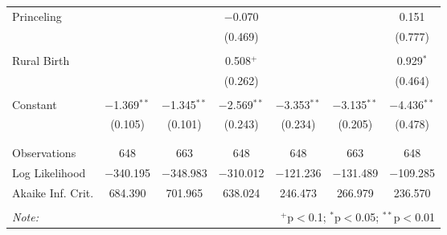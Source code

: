 \documentclass[12pt,letterpaper]{article}
\begin{document}
\begin{table}[!htbp]
\begin{tabular}{@{\extracolsep{5pt}}lcccccc}
		Princeling &  &  & $-$0.070 &  &  & 0.151 \\ 
		&  &  & (0.469) &  &  & (0.777) \\ 
		& & & & & & \\ 
		Rural Birth &  &  & 0.508$^{+}$ &  &  & 0.929$^{*}$ \\ 
		&  &  & (0.262) &  &  & (0.464) \\ 
		& & & & & & \\ 
		Constant & $-$1.369$^{**}$ & $-$1.345$^{**}$ & $-$2.569$^{**}$ & $-$3.353$^{**}$ & $-$3.135$^{**}$ & $-$4.436$^{**}$ \\ 
		& (0.105) & (0.101) & (0.243) & (0.234) & (0.205) & (0.478) \\ 
		& & & & & & \\ 
		\hline \\[-1.8ex] 
		Observations & 648 & 663 & 648 & 648 & 663 & 648 \\ 
		Log Likelihood & $-$340.195 & $-$348.983 & $-$310.012 & $-$121.236 & $-$131.489 & $-$109.285 \\ 
		Akaike Inf. Crit. & 684.390 & 701.965 & 638.024 & 246.473 & 266.979 & 236.570 \\ 
		\hline 
		\hline \\[-1.8ex] 
		\textit{Note:}  & \multicolumn{6}{r}{$^{+}$p$<$0.1; $^{*}$p$<$0.05; $^{**}$p$<$0.01}} \\ 
\end{tabular} 
\end{table} 
\end{document}
